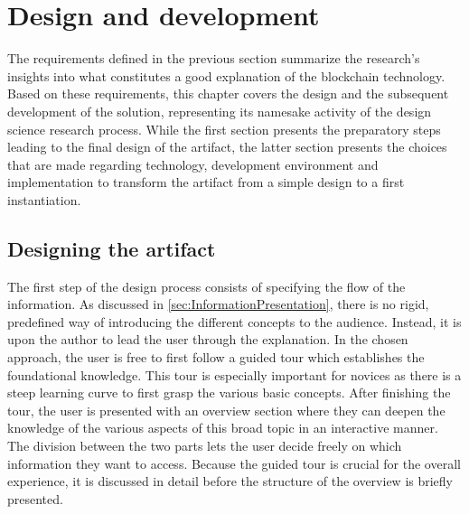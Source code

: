 \chapter{Design and development} \label{chap:designanddev}
The requirements defined in the previous section summarize the research's insights into what constitutes a good explanation of the blockchain technology. Based on these requirements, this chapter covers the design and the subsequent development of the solution, representing its namesake activity of the design science research process. While the first section presents the preparatory steps leading to the final design of the artifact, the latter section presents the choices that are made regarding technology, development environment and implementation to transform the artifact from a simple design to a first instantiation.

\section{Designing the artifact} \label{sec:ArtifactDesign}
The first step of the design process consists of specifying the flow of the information. As discussed in \ref{sec:InformationPresentation}, there is no rigid, predefined way of introducing the different concepts to the audience. Instead, it is upon the author to lead the user through the explanation. In the chosen approach, the user is free to first follow a guided tour which establishes the foundational knowledge. This tour is especially important for novices as there is a steep learning curve to first grasp the various basic concepts. After finishing the tour, the user is presented with an overview section where they can deepen the knowledge of the various aspects of this broad topic in an interactive manner. The division between the two parts lets the user decide freely on which information they want to access. Because the guided tour is crucial for the overall experience, it is discussed in detail before the structure of the overview is briefly presented.

